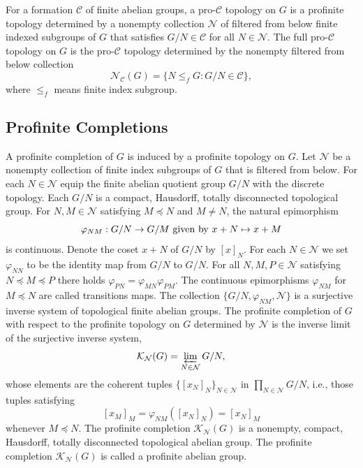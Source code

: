 \documentclass{amsart}
\theoremstyle{plain}
\theoremstyle{definition}
\theoremstyle{remark}
\begin{document}
For a formation ${\mathcal C}$ of finite abelian groups, a pro-${\mathcal C}$ topology on $G$ is a profinite topology determined by a nonempty collection ${\mathcal N}$ of filtered from below finite indexed subgroups of $G$ that satisfies $G/N\in {\mathcal C}$ for all $N\in{\mathcal N}$. The full pro-${\mathcal C}$ topology on $G$ is the pro-${\mathcal C}$ topology determined by the nonempty filtered from below collection
\[ {\mathcal N}_{\mathcal C}(G) = \{ N \leq_f G : G/N \in {\mathcal C}\},\]
where $\leq_f$ means finite index subgroup.


\subsection{Profinite Completions}

A profinite completion of $G$ is induced by a profinite topology on $G$. Let ${\mathcal N}$ be a nonempty collection of finite index subgroups of $G$ that is filtered from below. For each $N\in{\mathcal N}$ equip the finite abelian quotient group $G/N$ with the discrete topology. Each $G/N$ is a compact, Hausdorff, totally disconnected topological group. For $N,M\in{\mathcal N}$ satisfying $M\preceq N$ and $M\ne N$, the natural epimorphism
\[ \varphi_{NM}:G/N \to G/M {\rm \ given\ by\ } x + N \mapsto x +M\]
is continuous. Denote the coset $x+N$ of $G/N$ by $[x]_N$. For each $N\in {\mathcal N}$ we set $\varphi_{NN}$ to be the identity map from $G/N$ to $G/N$. For all $N,M,P\in {\mathcal N}$ satisfying $N\preceq M\preceq P$ there holds $\varphi_{PN} = \varphi_{MN}\varphi_{PM}$. The continuous epimorphisms $\varphi_{NM}$ for $M\preceq N$ are called transitions maps. The collection $\{ G/N, \varphi_{NM}, {\mathcal N}\}$ is a surjective inverse system of topological finite abelian groups. The profinite completion of $G$ with respect to the profinite topology on $G$ determined by ${\mathcal N}$ is the inverse limit of the surjective inverse system,
\[ {\mathcal K}_{\mathcal N}(G) = \varprojlim_{N\in{\mathcal N}} G/N,\]
whose elements are the coherent tuples $\{[x_N]_N\}_{N\in{\mathcal N}}$ in $\prod_{N\in{\mathcal N}} G/N$, i.e., those tuples satisfying
\[ [x_M]_M = \varphi_{NM}([x_N]_N) = [x_N]_M\]
whenever $M\preceq N$. The profinite completion ${\mathcal K}_{\mathcal N}(G)$ is a nonempty, compact, Hausdorff, totally disconnected topological abelian group. The profinite completion ${\mathcal K}_{\mathcal N}(G)$ is called a profinite abelian group.
\end{document}
